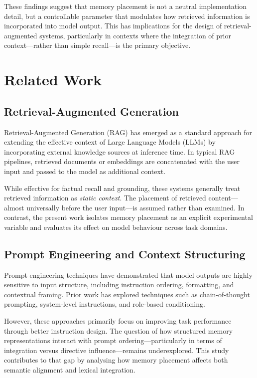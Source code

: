 \documentclass[11pt]{article}
\begin{document}
These findings suggest that memory placement is not a neutral implementation detail, but a controllable parameter that modulates how retrieved information is incorporated into model output. This has implications for the design of retrieval-augmented systems, particularly in contexts where the integration of prior context—rather than simple recall—is the primary objective.

\section{Related Work}

\subsection{Retrieval-Augmented Generation}

Retrieval-Augmented Generation (RAG) has emerged as a standard approach for extending the effective context of Large Language Models (LLMs) by incorporating external knowledge sources at inference time. In typical RAG pipelines, retrieved documents or embeddings are concatenated with the user input and passed to the model as additional context.

While effective for factual recall and grounding, these systems generally treat retrieved information as \textit{static context}. The placement of retrieved content—almost universally before the user input—is assumed rather than examined. In contrast, the present work isolates memory placement as an explicit experimental variable and evaluates its effect on model behaviour across task domains.

\subsection{Prompt Engineering and Context Structuring}

Prompt engineering techniques have demonstrated that model outputs are highly sensitive to input structure, including instruction ordering, formatting, and contextual framing. Prior work has explored techniques such as chain-of-thought prompting, system-level instructions, and role-based conditioning.

However, these approaches primarily focus on improving task performance through better instruction design. The question of how structured memory representations interact with prompt ordering—particularly in terms of integration versus directive influence—remains underexplored. This study contributes to that gap by analysing how memory placement affects both semantic alignment and lexical integration.
\end{document}
